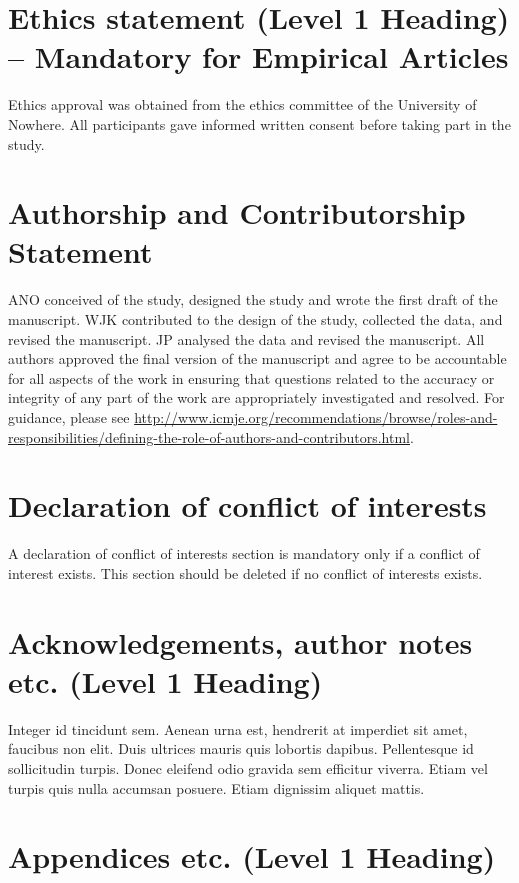 \documentclass{ldr-article}
\begin{document}
\section{Ethics statement (Level 1 Heading) – Mandatory for Empirical Articles}
Ethics approval was obtained from the ethics committee of the University of Nowhere. All participants gave informed written consent before taking part in the study.

\section{Authorship and Contributorship Statement}
ANO conceived of the study, designed the study and wrote the first draft of the manuscript. WJK contributed to the design of the study, collected the data, and revised the manuscript. JP analysed the data and revised the manuscript. All authors approved the final version of the manuscript and agree to be accountable for all aspects of the work in ensuring that questions related to the accuracy or integrity of any part of the work are appropriately investigated and resolved. For guidance, please see \url{http://www.icmje.org/recommendations/browse/roles-and-responsibilities/defining-the-role-of-authors-and-contributors.html}.

\section{Declaration of conflict of interests}
A declaration of conflict of interests section is mandatory only if a conflict of interest exists. This section should be deleted if no conflict of interests exists.

\section{Acknowledgements, author notes etc. (Level 1 Heading)}
Integer id tincidunt sem. Aenean urna est, hendrerit at imperdiet sit amet, faucibus non elit. Duis ultrices mauris quis lobortis dapibus. Pellentesque id sollicitudin turpis. Donec eleifend odio gravida sem efficitur viverra. Etiam vel turpis quis nulla accumsan posuere. Etiam dignissim aliquet mattis.


\clearpage
\appendix

\section{Appendices etc. (Level 1 Heading)}
\end{document}
